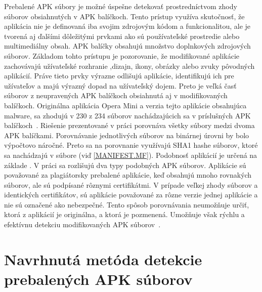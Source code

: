Prebalené APK súbory je možné úspešne detekovať prostredníctvom zhody súborov obsiahnutých v APK balíčkoch. Tento prístup využíva skutočnosť, že aplikácia nie je definovaná iba svojim zdrojovým kódom a funkcionalitou, ale je tvorená aj ďalšími dôležitými prvkami ako sú používateľské prostredie alebo multimediálny obsah. APK balíčky obsahujú množstvo doplnkových zdrojových súborov.  Základom tohto prístupu je pozorovanie, že modifikované aplikácie zachovávajú užívateľské rozhranie ,dizajn, ikony, obrázky alebo zvuky pôvodných aplikácií. Práve tieto prvky výrazne odlišujú aplikácie, identifikujú ich pre užívateľov a majú výrazný dopad na užívateľský dojem. Preto je veľká časť súborov z neupravených APK balíčkoch obsiahnutá aj v modifikovaných balíčkoch. Originálna aplikácia Opera Mini a verzia tejto aplikácie obsahujúca malware, sa zhodujú v 230 z 234 súborov nachádzajúcich sa v príslušných APK balíčkoch~\cite{Zhauniarovich2014}. Riešenie prezentované v práci  porovnáva všetky súbory medzi dvoma APK balíčkami.  Porovnávanie jednotlivých súborov na binárnej úrovni by bolo výpočtovo náročné. Preto sa na porovnanie využívajú SHA1 hashe súborov, ktoré sa nachádzajú v súbore  (viď \ref{MANIFEST.MF}). Podobnosť aplikácií je určená na základe . V práci sa rozlišujú dva typy podobných APK súborov. Aplikácie sú považované za plagiátorsky prebalené aplikácie, keď obsahujú mnoho rovnakých súborov, ale sú podpísané rôznymi certifikátmi. V prípade veľkej zhody súborov a  identických certifikátov, sú aplikácie považované za rôzne verzie jednej aplikácie a nie sú označené ako nebezpečné. Tento spôsob porovnávania neumožňuje určiť, ktorá z aplikácií je originálna, a ktorá je pozmenená. Umožňuje však rýchlu a efektívnu detekciu modifikovaných APK súborov~\cite{Zhauniarovich2014}. 

\section{Navrhnutá metóda detekcie prebalených APK súborov}

